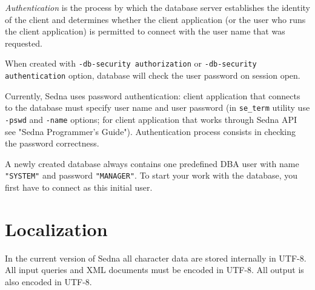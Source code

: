 \documentclass[a4paper,12pt]{article}
\begin{document}
\emph{Authentication} is the process by which the database server establishes
the identity of the client and determines whether the client application (or the
user who runs the client application) is permitted to connect with the user name
that was requested.

When created with \verb!-db-security authorization! or 
\verb!-db-security authentication! option, database will check the user password
on session open.

Currently, Sedna uses password authentication: client application that connects
to the database must specify user name and user password (in \verb!se_term!
utility use \verb!-pswd! and \verb!-name! options; for client application that
works through Sedna API see "Sedna Programmer's Guide"). Authentication process
consists in checking the password correctness.

A newly created database always contains one predefined DBA user with name
\verb!"SYSTEM"! and password \verb!"MANAGER"!. To start your work with the
database, you first have to connect as this initial user.


\section{Localization}

In the current version of Sedna all character data are stored internally in
UTF-8. All input queries and XML documents must be encoded in UTF-8. All output
is also encoded in UTF-8.
\end{document}
